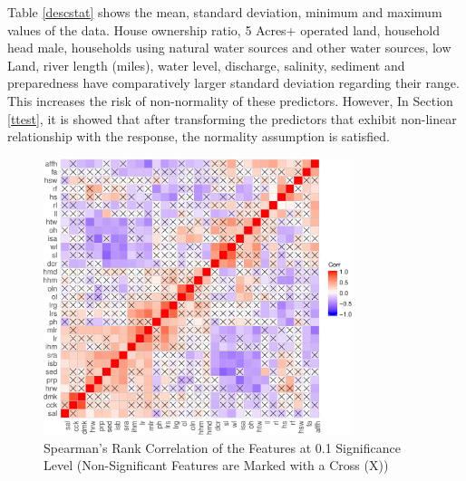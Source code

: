 \documentclass[preprint,review,12pt]{elsarticle}
\begin{document}
Table \ref{descstat} shows the mean, standard deviation, minimum and maximum values of the data. House ownership ratio, 5 Acres+ operated land, household head male, households using natural water sources and other water sources, low Land, river length (miles), water level, discharge, salinity, sediment and preparedness have comparatively larger standard deviation regarding their range. This increases the risk of non-normality of these predictors. However, In Section \ref{ttest}, it is showed that after transforming the predictors that exhibit non-linear relationship with the response, the normality assumption is satisfied.

\begin{figure}[ht!]
\centering
\includegraphics[width=90mm,keepaspectratio]{correlationplot.pdf}
\caption{Spearman's Rank Correlation of the Features at 0.1 Significance Level (Non-Significant Features are Marked with a Cross (X))}
\label{cor}
\end{figure}
\end{document}
